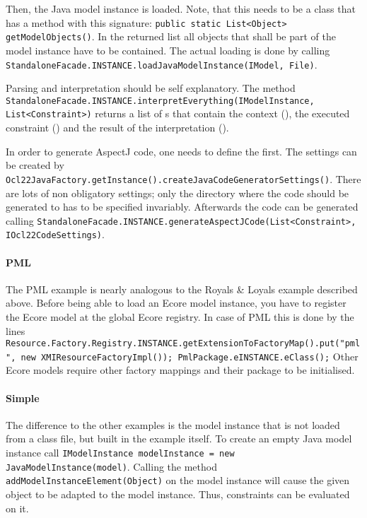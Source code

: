 Then, the Java model instance is loaded. Note, that this needs to be a class that has a method with this signature: \lstinline[breaklines=true]{public static List<Object> getModelObjects()}. In the returned list all objects that shall be part of the model instance have to be contained. The actual loading is done by calling \lstinline[breaklines=true]{StandaloneFacade.INSTANCE.loadJavaModelInstance(IModel, File)}.

Parsing and interpretation should be self explanatory. The method \lstinline[breaklines=true]{StandaloneFacade.INSTANCE.interpretEverything(IModelInstance, List<Constraint>)} returns a list of s that contain the context (), the executed constraint () and the result of the interpretation ().

In order to generate AspectJ code, one needs to define the  first. The settings can be created by \lstinline[breaklines=true]{Ocl22JavaFactory.getInstance().createJavaCodeGeneratorSettings()}. There are lots of non obligatory settings; only the directory where the code should be generated to has to be specified invariably. Afterwards the code can be generated calling \lstinline[breaklines=true]{StandaloneFacade.INSTANCE.generateAspectJCode(List<Constraint>, IOcl22CodeSettings)}.

\paragraph{PML}
The PML example is nearly analogous to the Royals \& Loyals example described above. Before being able to load an Ecore model instance, you have to register the Ecore model at the global Ecore registry. In case of PML this is done by the lines \lstinline[breaklines=true]{Resource.Factory.Registry.INSTANCE.getExtensionToFactoryMap().put("pml", new XMIResourceFactoryImpl()); PmlPackage.eINSTANCE.eClass();} Other Ecore models require other factory mappings and their package to be initialised.

\paragraph{Simple}
The difference to the other examples is the model instance that is not loaded from a class file, but built in the example itself. To create an empty Java model instance call \lstinline[breaklines=true]{IModelInstance modelInstance = new JavaModelInstance(model)}. Calling the method \lstinline[breaklines=true]{addModelInstanceElement(Object)} on the model instance will cause the given object to be adapted to the model instance. Thus, constraints can be evaluated on it.


